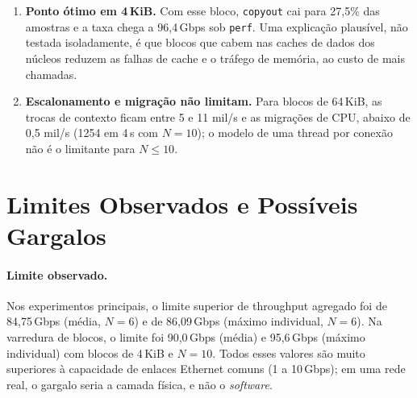 \documentclass[12pt,a4paper]{article}
\newcommand{\SI}[2]{\mbox{#1\,#2}}
\begin{document}
\begin{enumerate}
  e \texttt{tcp\_write\_xmit}, o tempo em modo usuário sobe para 9,5\% e as
  trocas de contexto, para cerca de 100 mil/s (contra
  6 mil/s com \SI{64}{KiB}). O gargalo desloca-se para o
  processamento por chamada/segmento no \textit{sender}, e o servidor fica
  com somente 5,0\% das amostras.
  \item \textbf{Ponto ótimo em \SI{4}{KiB}.} Com esse bloco, \texttt{copyout}
  cai para 27,5\% das amostras e a taxa chega a \SI{96,4}{Gbps} sob
  \texttt{perf}. Uma explicação plausível, não testada isoladamente, é que
  blocos que cabem nas caches de dados dos núcleos reduzem as
  falhas de cache e o tráfego de memória, ao custo de mais chamadas.
  \item \textbf{Escalonamento e migração não limitam.} Para blocos de
  \SI{64}{KiB}, as trocas de contexto ficam entre 5 e 11 mil/s e as
  migrações de CPU, abaixo de 0,5 mil/s (1254 em \SI{4}{s} com $N=10$); o
  modelo de uma thread por conexão não é o limitante para $N\le 10$.
\end{enumerate}

\section{Limites Observados e Possíveis Gargalos}

\paragraph{Limite observado.} Nos experimentos principais, o limite superior de
throughput agregado foi de \SI{84{,}75}{Gbps} (média, $N=6$) e de
\SI{86{,}09}{Gbps} (máximo individual, $N=6$). Na varredura de blocos, o
limite foi \SI{90{,}0}{Gbps} (média) e \SI{95{,}6}{Gbps} (máximo individual)
com blocos de \SI{4}{KiB} e $N=10$. Todos esses valores são muito superiores à
capacidade de enlaces Ethernet comuns (1 a \SI{10}{Gbps}); em uma rede real,
o gargalo seria a camada física, e não o \textit{software}.
\end{document}
